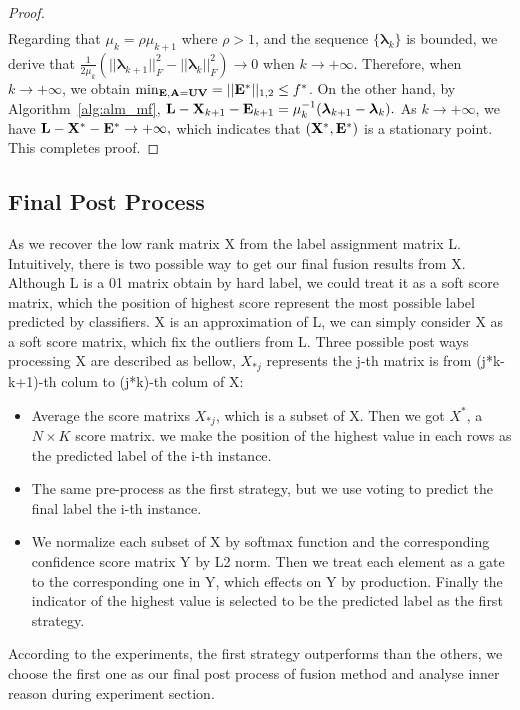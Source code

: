 \documentclass[letterpaper]{article}
\def\bE{{\bf E}}
\def\blambda{{\bm \lambda}}
\def\bL{{\bf L}}
\def\bU{{\bf U}}
\def\bV{{\bf V}}
\def\bX{{\bf X}}
\def\bA{{\bf A}}
\def\bX{{\bf X}}
\begin{document}
\begin{proof}
\begin{align}
    \end{align}
    \indent
    Regarding that $\mu_{k} = \rho \mu_{k+1}$ where $\rho > 1$, and the sequence $\{ \blambda_k \}$ is bounded, we derive that
    $\frac{1}{2\mu_k} (|| \blambda_{k+1} ||_F^2 - || \blambda_{k} ||_F^2) \rightarrow 0$ when $k \rightarrow +\infty .$
    Therefore, when $k \rightarrow +\infty$, we obtain $\min_{\bE, \bA = \bU \bV} = || \bE^* ||_{1,2} \leq f^*$.
    On the other hand, by Algorithm~\ref{alg:alm_mf}, $\bL - \bX_{k+1} - \bE_{k+1} = \mu_k^{-1} (\blambda_{k+1} - \blambda_{k}) .$
    As $k \rightarrow +\infty$, we have $\bL - \bX^* - \bE^* \rightarrow +\infty  ,$
    which indicates that $(\bX^*, \bE^*)$ is a stationary point.
    This completes proof.
\end{proof}




\subsection{Final Post Process}
As we recover the low rank matrix X from the label assignment matrix L. Intuitively, there is two possible way to get our final fusion results from X. Although L is a 01 matrix obtain by hard label, we could treat it as a soft score matrix, which the position of highest score represent the most possible label predicted by classifiers. X is an approximation of L, we can simply consider X as a soft score matrix, which fix the outliers from L. Three possible post ways processing X are described as bellow, $X_{*j}$ represents the j-th matrix is from (j*k-k+1)-th colum to (j*k)-th colum of X:
\begin{itemize}
  \item Average the score matrixs $X_{*j}$, which is a subset of X. Then we got $X^*$, a $N\times K$ score matrix. we make the position of the highest value in each rows as the predicted label of the i-th instance.
  \item The same pre-process as the first strategy, but we use voting to predict the final label the i-th instance.
  \item We normalize each subset of X by softmax function and the corresponding confidence score matrix Y by L2 norm. Then we treat each element as a gate to the corresponding one in Y, which effects on Y by production. Finally the indicator of the highest value is selected to be the predicted label as the first strategy.
\end{itemize}
According to the experiments, the first strategy outperforms than the others, we choose the first one as our final post process of fusion method and analyse inner reason during experiment section.
\end{document}
